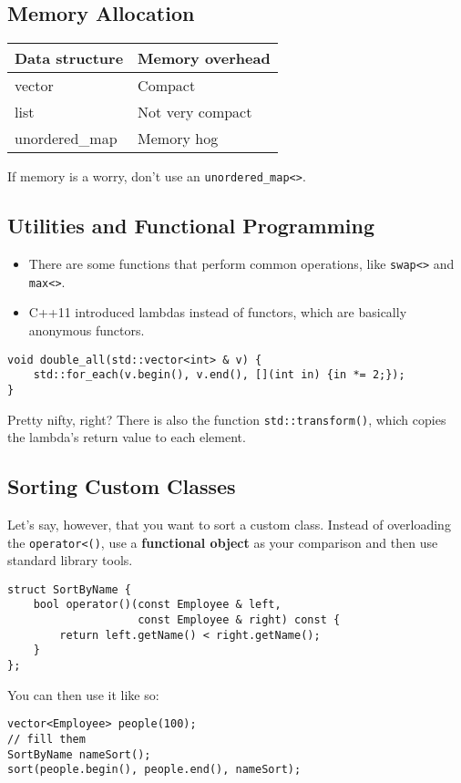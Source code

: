 \subsection{Memory Allocation}
\begin{tabular}{l|l}
	\textbf{Data structure} & \textbf{Memory overhead}\\
	\hline
	vector & Compact \\
	\hline
	list & Not very compact \\
	\hline
	unordered\_map & Memory hog
\end{tabular}
If memory is a worry, don't use an \lstinline[style=C++]{unordered_map<>}.

\subsection{Utilities and Functional Programming}
\begin{itemize}
	\item There are some functions that perform common operations, like \lstinline[style=C++]{swap<>} and \lstinline[style=C++]{max<>}.
	\item C++11 introduced lambdas instead of functors, which are basically anonymous functors.
\end{itemize}
\begin{lstlisting}[style=C++]
void double_all(std::vector<int> & v) {
    std::for_each(v.begin(), v.end(), [](int in) {in *= 2;});
}
\end{lstlisting}
Pretty nifty, right? There is also the function \lstinline[style=C++]{std::transform()}, which copies the lambda's return value to each element.

\subsection{Sorting Custom Classes}
Let's say, however, that you want to sort a custom class. Instead of overloading the \lstinline[style=C++]{operator<()}, use a \textbf{functional object} as your comparison and then use standard library tools.
\begin{lstlisting}[style=C++]
struct SortByName {
    bool operator()(const Employee & left,
                    const Employee & right) const {
        return left.getName() < right.getName();                
    }
};
\end{lstlisting}
You can then use it like so:
\begin{lstlisting}[style=C++]
vector<Employee> people(100);
// fill them
SortByName nameSort();
sort(people.begin(), people.end(), nameSort);	
\end{lstlisting}

